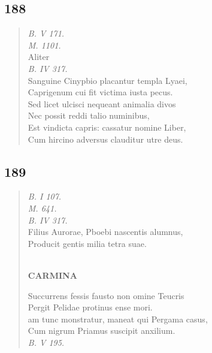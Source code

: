 \documentclass[11pt, a4paper]{report}
\begin{document}
            \subsection*{188}
      \begin{verse}
      \textit{B. V 171.} \\ \textit{M. 1101.} \\ Aliter \\ \textit{B. IV 317.} \\ Sanguine Cinypbio placantur templa Lyaei, \\ Caprigenum cui fit victima iusta pecus. \\ Sed licet ulcisci nequeant animalia divos \\ Nec possit reddi talio numinibus, \\ Est vindicta capris: cassatur nomine Liber, \\ Cum hircino adversus clauditur utre deus. \\ 
      \end{verse}
  
            \subsection*{189}
      \begin{verse}
      \textit{B. I 107.} \\ \textit{M. 641.} \\ \textit{B. IV 317.} \\ Filius Aurorae, Pboebi nascentis alumnus, \\ Producit gentis milia tetra suae. \\ 
        ﻿\pagebreak 
     \marginpar{[158]} \begin{center} \textbf{CARMINA} \end{center}Succurrens fessis fausto non omine Teucris \\ Pergit Pelidae protinus ense mori. \\ am tunc monstratur, maneat qui Pergama casus, \\ Cum nigrum Priamus suscipit anxilium. \\ \textit{B. V 195.} \\ 
      \end{verse}
  
\end{document}
